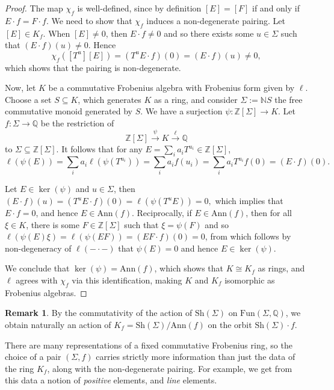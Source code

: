 \documentclass[oneside]{amsart}
\theoremstyle{plain}
\theoremstyle{definition}
\newtheorem{remark}[theorem]{Remark}
\newcommand{\Z}{{\mathbb{Z}}}
\newcommand{\N}{{\mathbb{N}}}
\newcommand{\Q}{{\mathbb{Q}}}
\newcommand{\Ann}{{\mathrm{Ann}}}
\newcommand{\Fun}{{\mathrm{Fun}}}
\newcommand{\Sh}{{\mathrm{Sh}}}
\begin{document}
\begin{proof}
    The map $\chi_f$ is well-defined, since by definition $[E] = [F]$ if and only if $E \cdot f = F \cdot f$.
    We need to show that $\chi_f$ induces a non-degenerate pairing. Let $[E] \in K_f$.
    When $[E] \neq 0$, then $E \cdot f \neq 0$ and so there exists some $u \in \Sigma$ such that
    $(E \cdot f)(u) \neq 0$. Hence
    \[
    \chi_f([T^u][E]) = (T^u E \cdot f)(0) = (E \cdot f)(u) \neq 0,
    \]
    which shows that the pairing is non-degenerate.
    
    Now, let $K$ be a commutative Frobenius algebra with Frobenius form given by $\ell$.
    Choose a set $S \subseteq K$, which generates $K$ as a ring,
    and consider $\Sigma := \N S$ the free commutative monoid generated by $S$.
    We have a surjection $\psi: \Z[\Sigma] \to K$. Let $f: \Sigma \to \Q$ be the restriction of
    $$
    \Z[\Sigma] \xrightarrow{\psi} K \xrightarrow{\ell} \Q
    $$
    to $\Sigma \subseteq \Z[\Sigma]$.
    It follows that for any $E = \sum_{i}a_iT^{u_i} \in \Z[\Sigma]$,
    \[\ell(\psi(E)) = \sum_{i}a_i\ell(\psi(T^{u_i})) = \sum_{i}a_i f(u_i)
    = \sum_{i}a_i T^{u_i}f(0) =  (E \cdot f)(0).\]
    
    Let $E \in \ker(\psi)$ and $u \in \Sigma$, then
    $(E \cdot f)(u) = (T^u E \cdot f)(0) = \ell(\psi(T^u E)) = 0,$ which implies that
    $E \cdot f = 0$, and hence $E \in \Ann(f)$.
    Reciprocally, if $E \in \Ann(f)$, then for
    all $\xi \in K$, there is some $F \in \Z[\Sigma]$ such that $\xi = \psi(F)$ and so
    $\ell(\psi(E) \xi) = \ell(\psi(EF)) = (EF \cdot f)(0) = 0$,
    from which follows by non-degeneracy of $\ell(-\cdot -)$ that 
    $\psi(E) = 0$ and hence $E \in \ker(\psi)$.

    We conclude that $\ker(\psi) = \Ann(f)$, which shows that $K \cong K_f$ as rings, and $\ell$ agrees with $\chi_f$ via this identification, making $K$ and $K_f$ isomorphic as Frobenius algebras.
\end{proof}

\begin{remark}\label{rem:action-orbit-sh}
    By the commutativity of the action of $\Sh(\Sigma)$ on $\Fun(\Sigma, \Q)$, 
    we obtain naturally 
    an action of $K_f = \Sh(\Sigma)/\Ann(f)$ on the orbit $\Sh(\Sigma) \cdot f$.
\end{remark}



There are many representations of a fixed commutative Frobenius ring, so the choice of a pair $(\Sigma, f)$ carries strictly more information than just the data of the ring $K_f$, along with the non-degenerate pairing. For example, we get from this data a notion of \emph{positive} elements, and \emph{line} elements.
\end{document}
